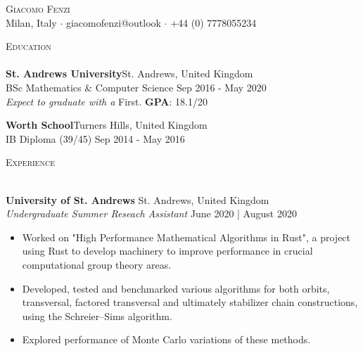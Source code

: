 \documentclass[a4paper]{article}
\newcommand{\lineunder} {
    \vspace*{-8pt} \\
    \hspace*{-18pt} \hrulefill \\
}
\newcommand{\header} [1] {
    {\hspace*{-18pt}\vspace*{6pt} \textsc{#1}}
    \vspace*{-6pt} \lineunder
}
\begin{document}
\vspace*{-40pt}



\vspace*{-10pt}
\begin{center}
    {\Huge \scshape {Giacomo Fenzi}}\\
    Milan, Italy $\cdot$ giacomofenzi@outlook $\cdot$ +44 (0) 7778055234\\
\end{center}

\header{Education}
\textbf{St. Andrews University}\hfill St. Andrews, United Kingdom\\
BSc Mathematics \& Computer Science \hfill Sep 2016 - May 2020\\
\textit{Expect to graduate with a} First. \textbf{GPA}: 18.1/20 \\
\vspace{2mm}

\textbf{Worth School}\hfill Turners Hills, United Kingdom\\
IB Diploma (39/45) \hfill Sep 2014 - May 2016 \\

\vspace{2mm}

\header{Experience}
\vspace{1mm}

\textbf{University of St. Andrews} \hfill St. Andrews, United Kingdom \\
\textit{Undergraduate Summer Reseach Assistant} \hfill{June 2020 | August 2020}
\vspace{-1mm}
\begin{itemize}
    \item Worked on "High Performance Mathematical Algorithms in Rust", a project
          using Rust to develop machinery to improve performance in crucial computational group theory areas.
    \item Developed, tested and benchmarked various algorithms for both orbits, transversal,
          factored transversal and ultimately stabilizer chain constructions, using the Schreier–Sims algorithm.
    \item Explored performance of Monte Carlo variations of these methods.
\end{itemize}
\end{document}
